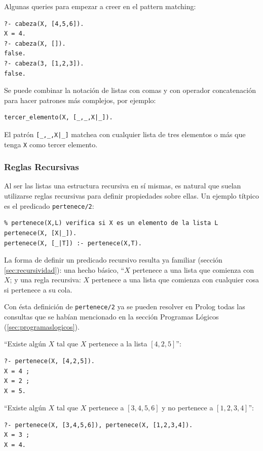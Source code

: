 \documentclass[12pt,titlepage]{article}
\begin{document}
Algunas queries para empezar a creer en el pattern matching:
\begin{lstlisting}
?- cabeza(X, [4,5,6]).
X = 4.
?- cabeza(X, []).
false.
?- cabeza(3, [1,2,3]).
false.
\end{lstlisting}

Se puede combinar la notación de listas con comas y con operador concatenación para hacer patrones más complejos, por ejemplo:
\begin{lstlisting}
tercer_elemento(X, [_,_,X|_]).
\end{lstlisting}

El patrón \lstinline$[_,_,X|_]$ matchea con cualquier lista de tres elementos o más que tenga \lstinline|X| como tercer elemento.

\subsubsection*{Reglas Recursivas}
\label{sec:reglasrecursivas}

Al ser las listas una estructura recursiva en sí mismas, es natural que suelan utilizarse reglas recursivas para definir propiedades sobre ellas. Un ejemplo títpico es el predicado \lstinline|pertenece/2|:
\begin{lstlisting}
% pertenece(X,L) verifica si X es un elemento de la lista L
pertenece(X, [X|_]).
pertenece(X, [_|T]) :- pertenece(X,T).
\end{lstlisting}

La forma de definir un predicado recursivo resulta ya familiar (sección \ref{sec:recursividad}): una hecho básico, ``$X$ pertenece a una lista que comienza con $X$; y una regla recursiva: $X$ pertenece a una lista que comienza con cualquier cosa si pertenece a su cola.

Con ésta definición de \lstinline|pertenece/2| ya se pueden resolver en Prolog todas las consultas que se habían mencionado en la sección Programas Lógicos (\ref{sec:programaslogicos}).

``Existe algún $X$ tal que $X$ pertenece a la lista $[4,2,5]$'':
\begin{lstlisting}
?- pertenece(X, [4,2,5]).
X = 4 ;
X = 2 ;
X = 5.
\end{lstlisting}

``Existe algún $X$ tal que $X$ pertenece a $[3,4,5,6]$ y no pertenece a $[1,2,3,4]$'':
\begin{lstlisting}
?- pertenece(X, [3,4,5,6]), pertenece(X, [1,2,3,4]).
X = 3 ;
X = 4.
\end{lstlisting}
\end{document}
